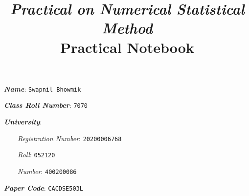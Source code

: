 \documentclass[12pt, a4paper]{memoir}
\title{\Huge{\emph{Practical on Numerical Statistical Method}}\\ \normalsize{Practical Notebook}}
\author{}
\date{}
\begin{document}
\parindent0pt

  \begin{titlingpage}
    \maketitle
    \thispagestyle{empty}
    \begin{tcolorbox}
      \textbf{\emph{Name}}: \verb+Swapnil Bhowmik+

      \textbf{\emph{Class Roll Number}}: \verb+7070+

      \textbf{\emph{University}}:

      \ \ \ \ \emph{Registration Number}: \verb+20200006768+

      \ \ \ \ \emph{Roll}: \verb+052120+

      \ \ \ \ \emph{Number}: \verb+400200086+

      \textbf{\emph{Paper Code}}: \verb+CACDSE503L+
    \end{tcolorbox}
  \end{titlingpage}
  \newpage
\end{document}
